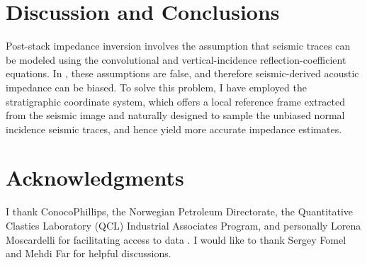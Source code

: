 


\section{Discussion and Conclusions}

 Post-stack impedance inversion involves the assumption that seismic traces can be modeled using the convolutional and vertical-incidence reflection-coefficient equations. In , these assumptions are false, and therefore seismic-derived acoustic impedance can be biased. To solve this problem, I have employed the stratigraphic coordinate system, which offers a local reference frame extracted from the seismic image and naturally designed to sample the unbiased normal incidence seismic traces, and hence yield more accurate impedance estimates.

\section{Acknowledgments}
I thank ConocoPhillips, the Norwegian Petroleum Directorate, the Quantitative Clastics Laboratory (QCL) Industrial Associates Program, and personally Lorena Moscardelli for facilitating access to data . I would like to thank Sergey Fomel and Mehdi Far for helpful discussions. 



